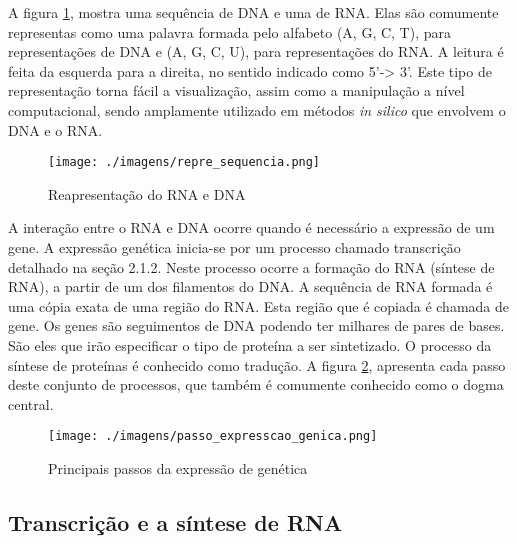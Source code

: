 A figura \ref{fig:repre_sequencia}, mostra uma sequência de DNA e uma de RNA. Elas são comumente representas como uma palavra formada pelo alfabeto (A, G, C, T), para representações de DNA e (A, G, C, U), para representações do RNA. A leitura é feita da esquerda para a direita, no sentido indicado como 5'-> 3'. Este tipo de representação torna fácil a visualização, assim como a manipulação a nível computacional, sendo amplamente utilizado em métodos \textit{in silico} que envolvem o DNA e o RNA.

\begin{figure}[htb!]
    \centering
    \texttt{[image: ./imagens/repre\_sequencia.png]}
    \caption{Reapresentação do RNA e DNA}
    \label{fig:repre_sequencia}
\end{figure}

A interação entre o RNA e DNA ocorre quando é necessário a expressão de um gene. A expressão genética inicia-se por um processo chamado transcrição detalhado na seção 2.1.2. Neste processo ocorre a formação do RNA (síntese de RNA), a partir de um dos filamentos do DNA. A sequência de RNA formada é uma cópia exata de uma região do RNA. Esta região que é copiada é chamada de gene. Os genes são seguimentos de DNA podendo ter milhares de pares de bases. São eles que irão especificar o tipo de proteína a ser sintetizado. O processo da síntese de proteínas é conhecido como tradução. A figura \ref{fig:passo_expresscao_genica}, apresenta cada passo deste conjunto de processos, que também é comumente conhecido como o dogma central.

\begin{figure}[htb!]
    \centering
    \texttt{[image: ./imagens/passo\_expresscao\_genica.png]}
    \caption{Principais passos da expressão de genética}
    \label{fig:passo_expresscao_genica}
\end{figure}


\subsection{ Transcrição e a síntese de RNA}


